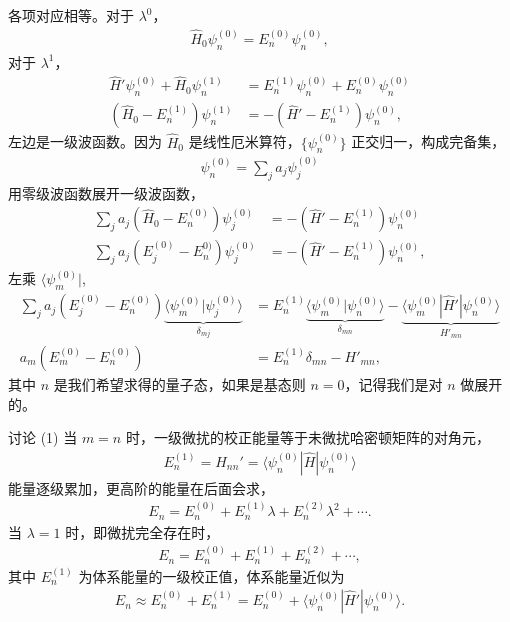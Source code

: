 各项对应相等。对于 $\lambda^0$，
\begin{align}
    \hat H_0 \psi_n^{(0)} = E_n^{(0)} \psi_n^{(0)},
\end{align}
对于 $\lambda^1$，
\begin{align}
    \hat H' \psi_n^{(0)} + \hat H_0 \psi_n^{(1)} &= E_n^{(1)} \psi_n^{(0)} + E_n^{(0)} \psi_n^{(0)} \\
    (\hat H_0 - E_n^{(1)})\psi_n^{(1)}&= - (\hat H' - E_n^{(1)}) \psi_n^{(0)},
\end{align}
左边是一级波函数。因为 $\hat H_0$ 是线性厄米算符，$\{\psi_n^{(0)}\}$ 正交归一，构成完备集，
\begin{align}
    \psi_n^{(0)} = \sum_j a_j \psi_j^{(0)}
\end{align}
用零级波函数展开一级波函数，
\begin{align}
    \sum_j a_j (\hat H_0 - E_n^{(0)}) \psi_j^{(0)} &= - (\hat H' - E_n^{(1)}) \psi_n^{(0)}\\
    \sum_j a_j (E_j^{(0)} - E_n^{0)}) \psi_j^{(0)} &= - (\hat H' - E_n^{(1)}) \psi_n^{(0)},
\end{align}
左乘 $\langle \psi_m^{(0)}|$,
\begin{align}
    \sum_j a_j (E_j^{(0)} - E_n^{(0)}) 
    \underbrace{\langle \psi_m^{(0)} | \psi_j^{(0)} \rangle}_{\delta_{mj}}
    &= E_n^{(1)} 
    \underbrace{\langle \psi_m^{(0)} | \psi_n^{(0)} \rangle}_{\delta_{mn}}
    - 
    \underbrace{\langle \psi_m^{(0)} | \hat H' | \psi_n^{(0)} \rangle}_{H'_{mn}} \\
    a_m (E_m^{(0)} - E_n^{(0)}) &= E_n^{(1)} \delta_{mn} - H'_{mn}, 
\end{align}
其中 $n$ 是我们希望求得的量子态，如果是基态则 $n=0$，记得我们是对 $n$ 做展开的。

讨论 (1) 当 $m=n$ 时，一级微扰的校正能量等于未微扰哈密顿矩阵的对角元，
\begin{align}
    E_n^{(1)} = H_{nn}' = \langle \psi_n^{(0)} | \hat H | \psi_n^{(0)} \rangle
\end{align}
能量逐级累加，更高阶的能量在后面会求，
\begin{align}
    E_n = E_n^{(0)} + E_n^{(1)} \lambda + E_n^{(2)}\lambda ^2 + \cdots.
\end{align}
当 $\lambda = 1$ 时，即微扰完全存在时，
\begin{align}
    E_n = E_n^{(0)} + E_n^{(1)} + E_n^{(2)} + \cdots, 
\end{align}
其中 $E_n^{(1)}$ 为体系能量的一级校正值，体系能量近似为
\begin{align}
    E_n \approx E_n^{(0)} + E_n^{(1)} = E_n^{(0)} + \langle \psi_n^{(0)} | \hat H ' | \psi_n^{(0)} \rangle. 
\end{align}

